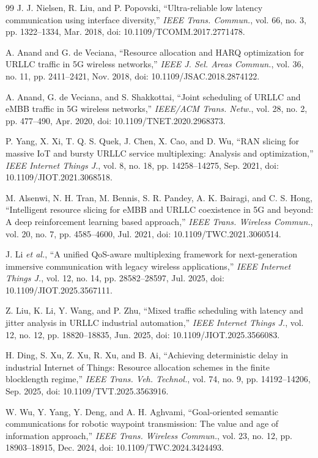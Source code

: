 \documentclass[letterpaper,journal]{IEEEtran}
\newcommand{\etal}{\emph{et al.}}
\begin{document}
\begin{thebibliography}{99}
J. J. Nielsen, R. Liu, and P. Popovski, ``Ultra-reliable low latency
communication using interface diversity,'' \emph{IEEE Trans. Commun.},
vol. 66, no. 3, pp. 1322--1334, Mar. 2018,
doi: 10.1109/TCOMM.2017.2771478.

A. Anand and G. de Veciana, ``Resource allocation and HARQ optimization for
URLLC traffic in 5G wireless networks,'' \emph{IEEE J. Sel. Areas Commun.},
vol. 36, no. 11, pp. 2411--2421, Nov. 2018,
doi: 10.1109/JSAC.2018.2874122.

A. Anand, G. de Veciana, and S. Shakkottai, ``Joint scheduling of URLLC and
eMBB traffic in 5G wireless networks,'' \emph{IEEE/ACM Trans. Netw.},
vol. 28, no. 2, pp. 477--490, Apr. 2020,
doi: 10.1109/TNET.2020.2968373.

P. Yang, X. Xi, T. Q. S. Quek, J. Chen, X. Cao, and D. Wu, ``RAN slicing
for massive IoT and bursty URLLC service multiplexing: Analysis and
optimization,'' \emph{IEEE Internet Things J.}, vol. 8, no. 18,
pp. 14258--14275, Sep. 2021,
doi: 10.1109/JIOT.2021.3068518.

M. Alsenwi, N. H. Tran, M. Bennis, S. R. Pandey, A. K. Bairagi, and
C. S. Hong, ``Intelligent resource slicing for eMBB and URLLC coexistence in
5G and beyond: A deep reinforcement learning based approach,'' \emph{IEEE
Trans. Wireless Commun.}, vol. 20, no. 7, pp. 4585--4600, Jul. 2021,
doi: 10.1109/TWC.2021.3060514.

J. Li \etal, ``A unified QoS-aware multiplexing framework for next-generation
immersive communication with legacy wireless applications,'' \emph{IEEE
Internet Things J.}, vol. 12, no. 14, pp. 28582--28597, Jul. 2025,
doi: 10.1109/JIOT.2025.3567111.

Z. Liu, K. Li, Y. Wang, and P. Zhu, ``Mixed traffic scheduling with latency
and jitter analysis in URLLC industrial automation,'' \emph{IEEE Internet
Things J.}, vol. 12, no. 12, pp. 18820--18835, Jun. 2025,
doi: 10.1109/JIOT.2025.3566083.

H. Ding, S. Xu, Z. Xu, R. Xu, and B. Ai, ``Achieving deterministic delay in
industrial Internet of Things: Resource allocation schemes in the finite
blocklength regime,'' \emph{IEEE Trans. Veh. Technol.}, vol. 74, no. 9,
pp. 14192--14206, Sep. 2025,
doi: 10.1109/TVT.2025.3563916.

W. Wu, Y. Yang, Y. Deng, and A. H. Aghvami, ``Goal-oriented semantic
communications for robotic waypoint transmission: The value and age of
information approach,'' \emph{IEEE Trans. Wireless Commun.}, vol. 23, no. 12,
pp. 18903--18915, Dec. 2024,
doi: 10.1109/TWC.2024.3424493.


\end{thebibliography}
\end{document}
